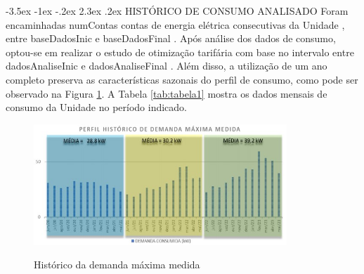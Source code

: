 \documentclass[a4paper,12pt]{abntex2}
\makeatletter
\renewcommand\chapter{\@startsection{chapter}{0}{\z@}%
  {-3.5ex \@plus -1ex \@minus -.2ex}%
  {2.3ex \@plus.2ex}%
  {\normalfont\large\bfseries}}
\makeatother
\begin{document}
\chapter{HISTÓRICO DE CONSUMO ANALISADO}
Foram  encaminhadas  {{ numContas }}  contas  de  energia  elétrica  consecutivas  da  {{ Unidade }}, 
entre  {{ baseDadosInic }} e {{ baseDadosFinal }}. Após análise dos dados de consumo, optou-se em realizar 
o  estudo  de  otimização  tarifária  com  base  no  intervalo  entre  {{ dadosAnaliseInic }}  e
{{ dadosAnaliseFinal }}.  Além  disso,  a  utilização  de  um  ano  completo  preserva  as  características 
sazonais do perfil de consumo, como pode ser observado na Figura \ref{fig:grafico1}. A Tabela \ref{tab:tabela1} mostra 
os dados mensais de consumo da {{ Unidade }} no período indicado.


\begin{figure}[!ht]
    \centering
    \caption{Histórico da demanda máxima medida}
    \includegraphics[width=0.85\textwidth]{templates/FIGS/grafico1}
    \label{fig:grafico1}
\end{figure}
\end{document}
